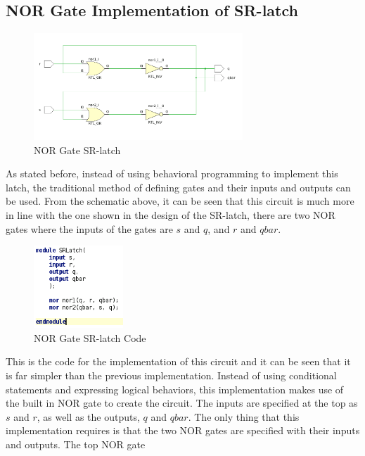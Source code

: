 \documentclass[12pt]{article}
\begin{document}
    \subsection*{NOR Gate Implementation of SR-latch}
    \begin{figure}[h]
        \centering
        \includegraphics[width=0.7\textwidth]{NOR Gate SRLatch.png}
        \caption{NOR Gate SR-latch}
    \end{figure}
    \par As stated before, instead of using behavioral programming to implement
    this latch, the traditional method of defining gates and their inputs and
    outputs can be used. From the schematic above, it can be seen that this
    circuit is much more in line with the one shown in the design of the
    SR-latch, there are two NOR gates where the inputs of the gates are $s$ and
    $q$, and $r$ and $qbar$.
    \begin{figure}[h]
        \centering
        \includegraphics[width=0.3\textwidth]{NOR Gate SRLatch Code.png}
        \caption{NOR Gate SR-latch Code}
    \end{figure}
    \par This is the code for the implementation of this circuit and it can be
    seen that it is far simpler than the previous implementation. Instead of
    using conditional statements and expressing logical behaviors, this
    implementation makes use of the built in NOR gate to create the circuit.
    The inputs are specified at the top as $s$ and $r$, as well as the outputs,
    $q$ and $qbar$. The only thing that this implementation requires is that the
    two NOR gates are specified with their inputs and outputs. The top NOR gate
\end{document}
